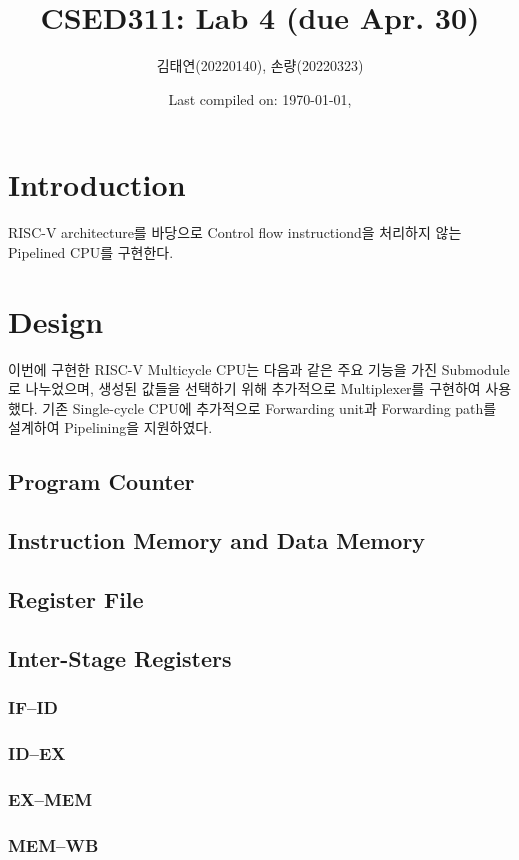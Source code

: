 \documentclass{scrartcl}
\title{CSED311: Lab 4 (due Apr. 30)}
\author{김태연(20220140), 손량(20220323)}
\date{Last compiled on: \today, \currenttime}
\begin{document}
\maketitle

\section{Introduction}
RISC-V architecture를 바당으로 Control flow instructiond을 처리하지 않는 Pipelined CPU를 구현한다.

\section{Design}
이번에 구현한 RISC-V Multicycle CPU는 다음과 같은 주요 기능을 가진 Submodule로 나누었으며, 생성된 값들을 선택하기 위해
추가적으로 Multiplexer를 구현하여 사용했다. 기존 Single-cycle CPU에 추가적으로 Forwarding unit과 Forwarding path를
설계하여 Pipelining을 지원하였다.

\subsection{Program Counter}

\subsection{Instruction Memory and Data Memory}

\subsection{Register File}

\subsection{Inter-Stage Registers}
\subsubsection{IF--ID}
\subsubsection{ID--EX}
\subsubsection{EX--MEM}
\subsubsection{MEM--WB}
\end{document}

